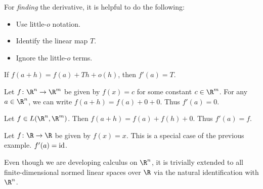 For \emph{finding} the derivative, it is helpful to do the following:
\begin{itemize}
    \item Use little-$o$ notation.
    \item Identify the linear map $T$.
    \item Ignore the little-$o$ terms.
\end{itemize}
If $f(a + h) = f(a) + Th + o(h)$, then $f'(a) = T$.

\begin{examples}
    \item Let $f\colon \R^n \to \R^m$ be given by $f(x) = c$
        for some constant $c \in \R^m$.
        For any $a \in \R^n$, we can write
        $f(a + h) = f(a) + 0 + 0$.
        Thus $f'(a) = 0$.
    \item Let $f \in L(\R^n, \R^m)$.
        Then $f(a + h) = f(a) + f(h) + 0$.
        Thus $f'(a) = f$.
    \item Let $f\colon \R \to \R$ be given by $f(x) = x$.
        This is a special case of the previous example.
        $f'(a) = \operatorname{id}$.
\end{examples}

Even though we are developing calculus on $\R^n$, it is trivially extended
to all finite-dimensional normed linear spaces over $\R$ via the natural
identification with $\R^n$.
